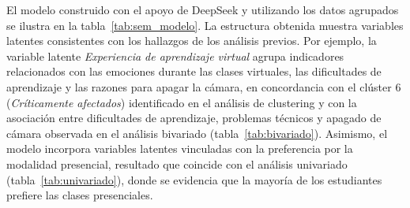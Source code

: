 \documentclass[conference]{IEEEtran}
\begin{document}
El modelo construido con el apoyo de DeepSeek y utilizando los datos agrupados se ilustra en la tabla~\ref{tab:sem_modelo}. La estructura obtenida muestra variables latentes consistentes con los hallazgos de los análisis previos. Por ejemplo, la variable latente \textit{Experiencia de aprendizaje virtual} agrupa indicadores relacionados con las emociones durante las clases virtuales, las dificultades de aprendizaje y las razones para apagar la cámara, en concordancia con el clúster 6 (\textit{Críticamente afectados}) identificado en el análisis de clustering y con la asociación entre dificultades de aprendizaje, problemas técnicos y apagado de cámara observada en el análisis bivariado (tabla~\ref{tab:bivariado}). Asimismo, el modelo incorpora variables latentes vinculadas con la preferencia por la modalidad presencial, resultado que coincide con el análisis univariado (tabla~\ref{tab:univariado}), donde se evidencia que la mayoría de los estudiantes prefiere las clases presenciales.
\end{document}
